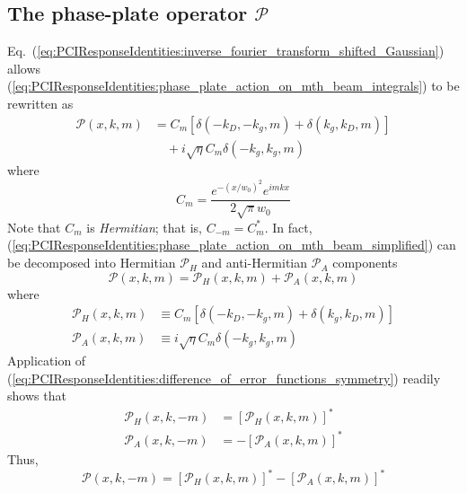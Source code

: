 \subsection{The phase-plate operator $\mathcal{P}$}
Eq.~(\ref{eq:PCIResponseIdentities:inverse_fourier_transform_shifted_Gaussian})
allows (\ref{eq:PCIResponseIdentities:phase_plate_action_on_mth_beam_integrals})
to be rewritten as
\begin{equation}
  \begin{aligned}
    \mathcal{P}(x, k, m)
    &=
    C_m
    [%
      \delta(-k_D, -k_g, m)
      +
      \delta(k_g, k_D, m)
    ]
    \\
    &\quad+
    i \sqrt{\eta} C_m \delta(-k_g, k_g, m)
  \end{aligned}
  \label{eq:PCIResponseIdentities:phase_plate_action_on_mth_beam_simplified}
\end{equation}
where
\begin{equation}
  C_m
  =
  \frac{e^{-(x / w_0)^2} e^{i m k x}}{2 \sqrt{\pi} w_0}
\end{equation}
Note that $C_m$ is \emph{Hermitian};
that is, $C_{-m} = C_m^*$.
In fact,
(\ref{eq:PCIResponseIdentities:phase_plate_action_on_mth_beam_simplified})
can be decomposed into Hermitian $\mathcal{P}_H$ and
anti-Hermitian $\mathcal{P}_A$ components
\begin{equation}
  \mathcal{P}(x, k, m)
  =
  \mathcal{P}_H(x, k, m)
  +
  \mathcal{P}_A(x, k, m)
  \label{eq:PCIResponseIdentities:phase_plate_action_on_mth_beam_Hermitian_decomposed}
\end{equation}
where
\begin{align}
  \mathcal{P}_H(x, k, m)
  &\equiv
  C_m
  [%
    \delta(-k_D, -k_g, m)
    +
    \delta(k_g, k_D, m)
  ]
  \label{eq:PCIResponseIdentities:phase_plate_action_on_mth_beam_Hermitian}
  \\
  \mathcal{P}_A(x, k, m)
  &\equiv
  i \sqrt{\eta} C_m \delta(-k_g, k_g, m)
  \label{eq:PCIResponseIdentities:phase_plate_action_on_mth_beam_antiHermitian}
\end{align}
Application of
(\ref{eq:PCIResponseIdentities:difference_of_error_functions_symmetry})
readily shows that
\begin{align}
  \mathcal{P}_H(x, k, -m) &= [\mathcal{P}_H(x, k, m)]^*
  \\
  \mathcal{P}_A(x, k, -m) &= -[\mathcal{P}_A(x, k, m)]^*
\end{align}
Thus,
\begin{equation}
  \mathcal{P}(x, k, -m)
  =
  [\mathcal{P}_H(x, k, m)]^*
  -
  [\mathcal{P}_A(x, k, m)]^*
  \label{eq:PCIResponseIdentities:phase_plate_action_on_mth_beam_symmetry}
\end{equation}

